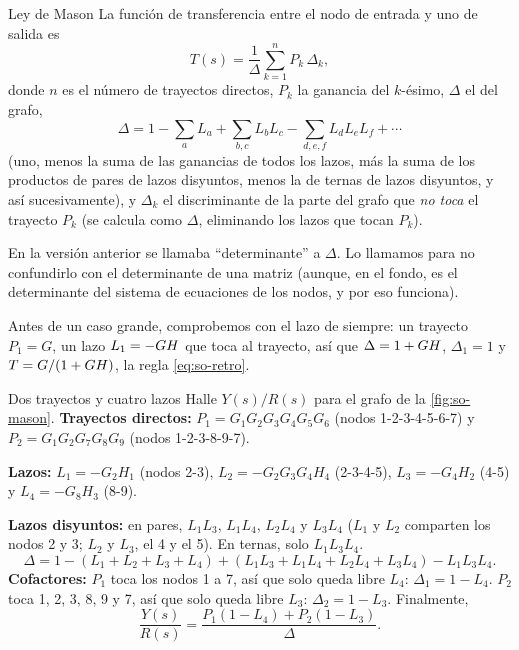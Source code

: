 \begin{definicion}[label=def:so-mason]{Ley de Mason}
La función de transferencia entre el nodo de entrada y uno de salida es
\begin{equation}
  T(s)=\frac{1}{\Delta}\sum_{k=1}^{n}P_k\,\Delta_k,
  \label{eq:so-mason}
\end{equation}
donde $n$ es el número de trayectos directos, $P_k$ la ganancia del $k$-ésimo, $\Delta$ el  del grafo,
\begin{equation}
  \Delta=1-\sum_a L_a+\sum_{b,c}L_bL_c-\sum_{d,e,f}L_dL_eL_f+\cdots
  \label{eq:so-discriminante}
\end{equation}
(uno, menos la suma de las ganancias de todos los lazos, más la suma de los productos de pares de lazos disyuntos, menos la de ternas de lazos disyuntos, y así sucesivamente), y $\Delta_k$ el discriminante de la parte del grafo que \emph{no toca} el trayecto $P_k$ (se calcula como $\Delta$, eliminando los lazos que tocan $P_k$).
\end{definicion}

\begin{cuidado}
En la versión anterior se llamaba ``determinante'' a $\Delta$. Lo llamamos  para no confundirlo con el determinante de una matriz (aunque, en el fondo, es el determinante del sistema de ecuaciones de los nodos, y por eso funciona).
\end{cuidado}

Antes de un caso grande, comprobemos con el lazo de siempre: un trayecto $P_1=G$, un lazo $L_1=-GH$ que toca al trayecto, así que $\Delta=1+GH$, $\Delta_1=1$ y $T=G/(1+GH)$, la regla \eqref{eq:so-retro}.

\begin{ejemplo}[label=ej:so-mason]{Dos trayectos y cuatro lazos}
Halle $Y(s)/R(s)$ para el grafo de la \cref{fig:so-mason}.
\solucion \textbf{Trayectos directos:} $P_1=G_1G_2G_3G_4G_5G_6$ (nodos 1-2-3-4-5-6-7) y $P_2=G_1G_2G_7G_8G_9$ (nodos 1-2-3-8-9-7).

\textbf{Lazos:} $L_1=-G_2H_1$ (nodos 2-3), $L_2=-G_2G_3G_4H_4$ (2-3-4-5), $L_3=-G_4H_2$ (4-5) y $L_4=-G_8H_3$ (8-9).

\textbf{Lazos disyuntos:} en pares, $L_1L_3$, $L_1L_4$, $L_2L_4$ y $L_3L_4$ ($L_1$ y $L_2$ comparten los nodos 2 y 3; $L_2$ y $L_3$, el 4 y el 5). En ternas, solo $L_1L_3L_4$.
\[
  \Delta=1-(L_1+L_2+L_3+L_4)+(L_1L_3+L_1L_4+L_2L_4+L_3L_4)-L_1L_3L_4.
\]
\textbf{Cofactores:} $P_1$ toca los nodos 1 a 7, así que solo queda libre $L_4$: $\Delta_1=1-L_4$. $P_2$ toca 1, 2, 3, 8, 9 y 7, así que solo queda libre $L_3$: $\Delta_2=1-L_3$. Finalmente,
\[
  \frac{Y(s)}{R(s)}=\frac{P_1(1-L_4)+P_2(1-L_3)}{\Delta}.
\]
\end{ejemplo}

